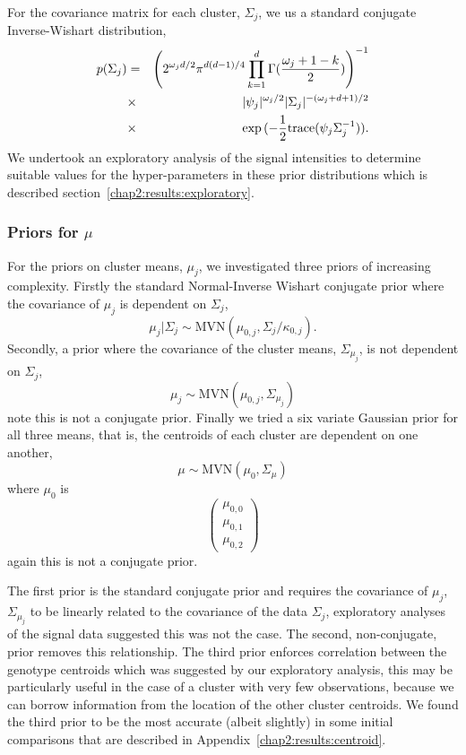 For the covariance matrix for each cluster, $\Sigma_j$, we us a standard conjugate Inverse-Wishart distribution,
\begin{eqnarray}
p(\Sigma_j) &=& \left(2^{\omega_jd/2}\pi^{d(d-1)/4} \prod^d_{k=1}\Gamma(\frac{\omega_j+1-k}{2})\right)^{-1} \nonumber\\
&\times& |\psi_j|^{\omega_j/2} |\Sigma_j|^{-(\omega_j+d+1)/2}\\\nonumber
& \times& \exp{(-\half \textrm{trace}(\psi_j\Sigma_j^{-1}))} \label{invWish}.
\end{eqnarray}
We undertook an exploratory analysis of the signal intensities to determine suitable values for the hyper-parameters in these prior distributions which is described section~\ref{chap2:results:exploratory}.


\subsubsection{Priors for $\mu$}
\label{chap2:method:muprior}
For the priors on cluster means, $\mu_j$, we  investigated three priors of increasing complexity.  Firstly the standard Normal-Inverse Wishart conjugate prior where the covariance of $\mu_j$ is dependent on $\Sigma_j$,
\begin{equation}\label{model1} \mu_j|\Sigma_j \sim \textrm{MVN}(\mu_{0,j},\Sigma_j/\kappa_{0,j}).\end{equation}
Secondly, a prior where the covariance of the cluster means, $\Sigma_{\mu_j}$, is not dependent on $\Sigma_j$,
\begin{equation}\label{model2} \mu_j \sim \textrm{MVN}(\mu_{0,j},\Sigma_{\mu_{j}}) \end{equation}
note this is not a conjugate prior.  Finally we tried a six variate Gaussian prior for all three means, that is, the centroids of each cluster are dependent on one another,
\begin{equation}\label{model3}\mu \sim \textrm{MVN}(\mu_0,\Sigma_{\mu})\end{equation}
 where $\mu_0$ is
\[ \left( \begin{array}{c}\mu_{0,0}\\\mu_{0,1}\\\mu_{0,2}\end{array}\right)\] 
again this is not a conjugate prior. 

The first prior is the standard conjugate prior and requires the covariance of $\mu_j$, $\Sigma_{\mu_j}$ to be linearly related to the covariance of the data $\Sigma_j$, exploratory analyses of the signal data suggested this was not the case.  The second, non-conjugate, prior removes this relationship.  The third prior enforces correlation between the genotype centroids which was suggested by our exploratory analysis, this may be particularly useful in the case of a cluster with very few observations, because we can borrow information from the location of the other cluster centroids.   We found the third prior to be the most accurate (albeit slightly) in some initial comparisons that are described in Appendix~\ref{chap2:results:centroid}.

